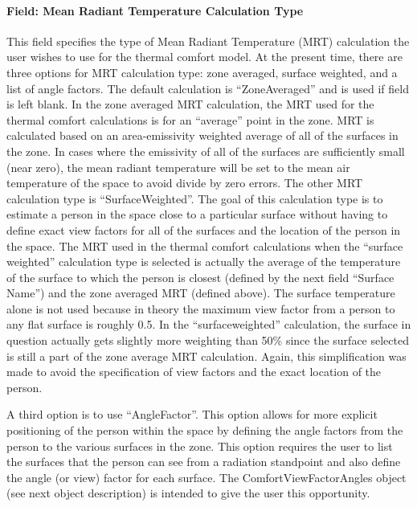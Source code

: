 \paragraph{Field: Mean Radiant Temperature Calculation Type}\label{field-mean-radiant-temperature-calculation-type}

This field specifies the type of Mean Radiant Temperature (MRT) calculation the user wishes to use for the thermal comfort model. At the present time, there are three options for MRT calculation type: zone averaged, surface weighted, and a list of angle factors. The default calculation is ``ZoneAveraged'' and is used if field is left blank. In the zone averaged MRT calculation, the MRT used for the thermal comfort calculations is for an ``average'' point in the zone. MRT is calculated based on an area-emissivity weighted average of all of the surfaces in the zone. In cases where the emissivity of all of the surfaces are sufficiently small (near zero), the mean radiant temperature will be set to the mean air temperature of the space to avoid divide by zero errors. The other MRT calculation type is ``SurfaceWeighted''. The goal of this calculation type is to estimate a person in the space close to a particular surface without having to define exact view factors for all of the surfaces and the location of the person in the space. The MRT used in the thermal comfort calculations when the ``surface weighted'' calculation type is selected is actually the average of the temperature of the surface to which the person is closest (defined by the next field ``Surface Name'') and the zone averaged MRT (defined above). The surface temperature alone is not used because in theory the maximum view factor from a person to any flat surface is roughly 0.5. In the ``surfaceweighted'' calculation, the surface in question actually gets slightly more weighting than 50\% since the surface selected is still a part of the zone average MRT calculation. Again, this simplification was made to avoid the specification of view factors and the exact location of the person.

A third option is to use ``AngleFactor''. This option allows for more explicit positioning of the person within the space by defining the angle factors from the person to the various surfaces in the zone. This option requires the user to list the surfaces that the person can see from a radiation standpoint and also define the angle (or view) factor for each surface. The ComfortViewFactorAngles object (see next object description) is intended to give the user this opportunity.

